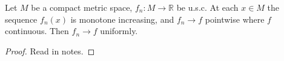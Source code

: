 \begin{theorem}
	Let $M$ be a compact metric space, $f_n: M \to \mathbb{R}$ be u.s.c. At each $x \in M$ the sequence $f_n(x)$ is monotone increasing, and $f_n \to f$ pointwise where $f$ continuous. Then $f_n \to f$ uniformly.
\end{theorem}
\begin{proof}
	Read in notes.
\end{proof}

